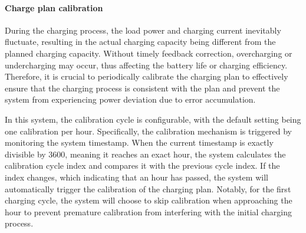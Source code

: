 \documentclass[
english,
ruledheaders=section,%
class=report,%
thesis={type=Report},%
accentcolor=9c,%
custommargins=true,%
marginpar=false,%
parskip=half-,%
fontsize=11pt,%
logofile={img/tuda_logo.pdf}, %
]{tudapub}
\begin{document}
    \paragraph{Charge plan calibration}
    \label{para:chargePlanCalibration}

    During the charging process, the load power and charging current inevitably fluctuate, resulting in the actual charging capacity being different from the planned charging capacity. Without timely feedback correction, overcharging or undercharging may occur, thus affecting the battery life or charging efficiency. Therefore, it is crucial to periodically calibrate the charging plan to effectively ensure that the charging process is consistent with the plan and prevent the system from experiencing power deviation due to error accumulation.

    In this system, the calibration cycle is configurable, with the default setting being one calibration per hour. Specifically, the calibration mechanism is triggered by monitoring the system timestamp. When the current timestamp is exactly divisible by 3600, meaning it reaches an exact hour, the system calculates the calibration cycle index and compares it with the previous cycle index. If the index changes, which indicating that an hour has passed, the system will automatically trigger the calibration of the charging plan. Notably, for the first charging cycle, the system will choose to skip calibration when approaching the hour to prevent premature calibration from interfering with the initial charging process.
\end{document}
